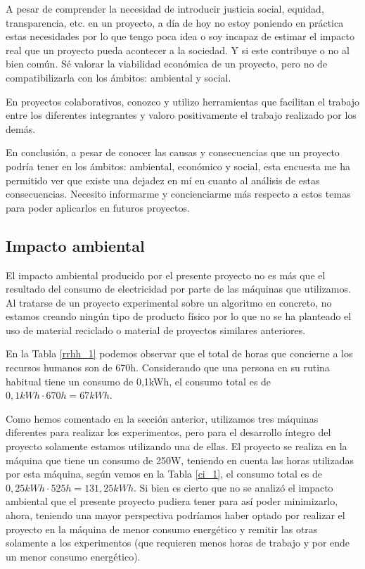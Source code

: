\documentclass[titlepage,12pt]{report}
\begin{document}
A pesar de comprender la necesidad de introducir justicia social, equidad, transparencia, etc. en un proyecto, a día de hoy no estoy poniendo en práctica estas necesidades por lo que tengo poca idea o soy incapaz de estimar el impacto real que un proyecto pueda acontecer a la sociedad. Y si este contribuye o no al bien común.
Sé valorar la viabilidad económica de un proyecto, pero no de compatibilizarla con los ámbitos: ambiental y social.

En proyectos colaborativos, conozco y utilizo herramientas que facilitan el trabajo entre los diferentes integrantes y valoro positivamente el trabajo realizado por los demás.

En conclusión, a pesar de conocer las causas y consecuencias que un proyecto podría tener en los ámbitos: ambiental, económico y social, esta encuesta me ha permitido ver que existe una dejadez en mí en cuanto al análisis de estas consecuencias. Necesito informarme y concienciarme más respecto a estos temas para poder aplicarlos en futuros proyectos.

\subsection{Impacto ambiental}

El impacto ambiental producido por el presente proyecto no es más que el resultado del consumo de electricidad por parte de las máquinas que utilizamos. Al tratarse de un proyecto experimental sobre un algoritmo en concreto, no estamos creando ningún tipo de producto físico por lo que no se ha planteado el uso de material reciclado o material de proyectos similares anteriores.

En la Tabla \ref{rrhh_1} podemos observar que el total de horas que concierne a los recursos humanos son de 670h. Considerando que una persona en su rutina habitual tiene un consumo de 0,1kWh, el consumo total es de $0,1kWh \cdot 670h = 67kWh$.

Como hemos comentado en la sección anterior, utilizamos tres máquinas diferentes para realizar los experimentos, pero para el desarrollo íntegro del proyecto solamente estamos utilizando una de ellas. El proyecto se realiza en la máquina que tiene un consumo de 250W, teniendo en cuenta las horas utilizadas por esta máquina, según vemos en la Tabla \ref{ci_1}, el consumo total es de $0,25kWh \cdot 525h = 131,25kWh$. Si bien es cierto que no se analizó el impacto ambiental que el presente proyecto pudiera tener para así poder minimizarlo, ahora, teniendo una mayor perspectiva podríamos haber optado por realizar el proyecto en la máquina de menor consumo energético y remitir las otras solamente a los experimentos (que requieren menos horas de trabajo y por ende un menor consumo energético).
\end{document}
